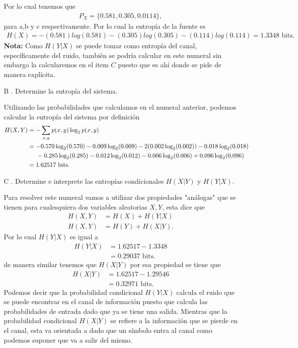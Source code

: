 \begin{enumerate}
\begin{sol}
Por lo cual tenemos que 
\begin{align*}
    P_X=\{0.581, 0.305, 0.0114\},
\end{align*}
para a,b y c respectivamente.
Por lo cual la entropía de la fuente es 
\begin{align*}
    H(X) =-(0.581)log(0.581) - (0.305)log(0.305) - (0.114)log(0.114) = 1.3348\text{ bits}
.\end{align*}
\textbf{Nota: }Como $H(Y|X)$ se puede tomar como entropía del canal, específicamente del ruido, también se podría calcular en este numeral sin embargo la calcularemos en el item $C$ puesto que es ahí donde se pide de manera explícita.
    \end{sol}
    \item[B]. Determine la entropía del sistema.\\
\begin{sol}
Utilizando las probabilidades que calculamos en el numeral anterior, podemos calcular la entropía del sistema por definición 
    \begin{align*}
        H(X, Y) &= - \sum_{x,y} p(x, y) \log_2 p(x, y)\\
        &=-0.570 \log_2 (0.570)- 0.009 \log_2 (0.009)-2(0.002 \log_2 (0.002))-0.018 \log_2 (0.018) \\
        &\hspace{0.5cm}- 0.285 \log_2 (0.285)- 0.012 \log_2 (0.012)- 0.006 \log_2 (0.006) + 0.096 \log_2 (0.096) \\
        &=1.62517 \text{ bits}
 .\end{align*}
\end{sol}
\item[C]. Determine e interprete las entropías condicionales $H(X|Y)$ y $H(Y|X)$.\\
\begin{sol}
Para resolver este numeral vamos a utilizar dos propiedades "análogas" que se tienen para cualesquiera dos variables aleatorias $X,Y$, esta dice que 
\begin{align*}
    H(X,Y)&=H(X)+H(Y|X)\\
     H(X,Y)&=H(Y)+H(X|Y)
.\end{align*}
Por lo cual $H(Y|X)$ es igual a 
\begin{align*}
    H(Y|X)&=1.62517-1.3348\\
    &=0.29037\text{ bits}
.\end{align*}
de manera similar tenemos que $H(X|Y)$ por esa propiedad se tiene que
\begin{align*}
    H(X|Y)&=1.62517- 1.29546\\
    &= 0.32971\text{ bits}
.\end{align*}
Podemos decir que la probabilidad condicional $H(Y|X)$ calcula el ruido que se puede encontrar en el canal de información puesto que calcula las probabilidades de entrada dado que ya se tiene una salida. Mientras que la probabilidad condicional $H(X|Y)$ se refiere a la información que se pierde en el canal, esta va orientada a dado que un símbolo entra al canal como podemos suponer que va a salir del mismo.


\end{sol}
\end{enumerate}
